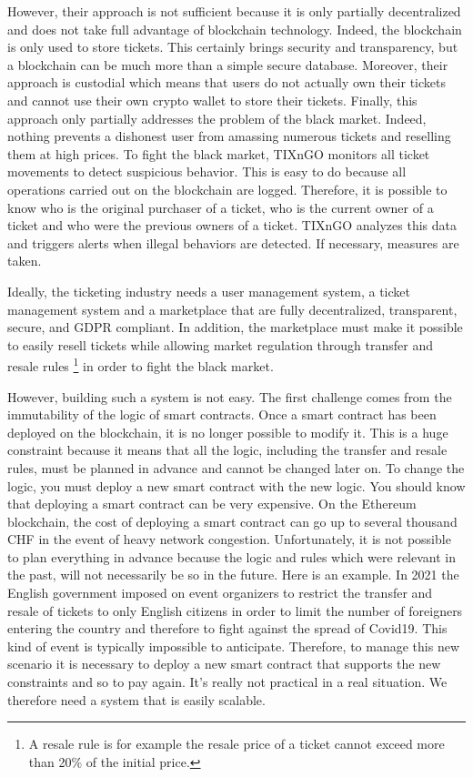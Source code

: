 \documentclass[a4paper,11pt,oneside]{report}
\begin{document}
However, their approach is not sufficient because it is only partially decentralized and does not take full advantage of blockchain technology. Indeed, the blockchain is only used to store tickets. This certainly brings security and transparency, but a blockchain can be much more than a simple secure database. Moreover, their approach is custodial which means that users do not actually own their tickets and cannot use their own crypto wallet to store their tickets. Finally, this approach only partially addresses the problem of the black market. Indeed, nothing prevents a dishonest user from amassing numerous tickets and reselling them at high prices. To fight the black market, TIXnGO monitors all ticket movements to detect suspicious behavior. This is easy to do because all operations carried out on the blockchain are logged. Therefore, it is possible to know who is the original purchaser of a ticket, who is the current owner of a ticket and who were the previous owners of a ticket. TIXnGO analyzes this data and triggers alerts when illegal behaviors are detected. If necessary, measures are taken.

Ideally, the ticketing industry needs a user management system, a ticket management system and a marketplace that are fully decentralized, transparent, secure, and GDPR compliant. In addition, the marketplace must make it possible to easily resell tickets while allowing market regulation through transfer and resale rules \footnote{A resale rule is for example the resale price of a ticket cannot exceed more than 20\% of the initial price.} in order to fight the black market.

However, building such a system is not easy. The first challenge comes from the immutability of the logic of smart contracts. Once a smart contract has been deployed on the blockchain, it is no longer possible to modify it. This is a huge constraint because it means that all the logic, including the transfer and resale rules, must be planned in advance and cannot be changed later on. To change the logic, you must deploy a new smart contract with the new logic. You should know that deploying a smart contract can be very expensive. On the Ethereum blockchain, the cost of deploying a smart contract can go up to several thousand CHF in the event of heavy network congestion. Unfortunately, it is not possible to plan everything in advance because the logic and rules which were relevant in the past, will not necessarily be so in the future. Here is an example. In 2021 the English government imposed on event organizers to restrict the transfer and resale of tickets to only English citizens in order to limit the number of foreigners entering the country and therefore to fight against the spread of Covid19. This kind of event is typically impossible to anticipate. Therefore, to manage this new scenario it is necessary to deploy a new smart contract that supports the new constraints and so to pay again. It's really not practical in a real situation. We therefore need a system that is easily scalable.
\end{document}
